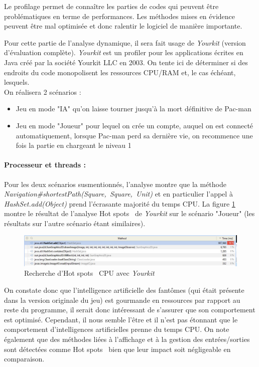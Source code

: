 \documentclass[12pt, openany]{report}
\begin{document}
Le profilage permet de connaître les parties de codes qui peuvent être problématiques en terme de performances. Les méthodes mises en évidence peuvent être mal optimisée et donc ralentir le logiciel de manière importante.


Pour cette partie de l'analyse dynamique, il sera fait usage de \textit{Yourkit} (version d'évaluation complète). \textit{Yourkit} est un profiler pour les applications écrites en Java créé par la société Yourkit LLC en 2003.  On tente ici de déterminer si des endroits du code monopolisent les ressources CPU/RAM et, le cas échéant, lesquels.\\


On réalisera 2 scénarios :
\begin{itemize}
	\item Jeu en mode "IA" qu'on laisse tourner jusqu'à la mort définitive de Pac-man
	\item Jeu en mode "Joueur" pour lequel on crée un compte, auquel on est connecté automatiquement, lorsque Pac-man perd sa dernière vie, on recommence une fois la partie en chargeant le niveau 1
\end{itemize}
\paragraph{Processeur et threads : }
Pour les deux scénarios susmentionnés, l'analyse montre que la méthode \mbox{\textit{Navigation\#shortestPath(Square, Square, Unit)}} et en particulier l'appel à \mbox{\textit{HashSet.add(Object)}} prend l'écrasante majorité du temps CPU. La figure \ref{hotspot} montre le résultat de l'analyse \og Hot spots \fg \, de \textit{Yourkit} sur le scénario "Joueur" (les résultats sur l'autre scénario étant similaires).
\begin{figure}[h]
	\centering
	\includegraphics[width=16cm]{Images/hotspot.JPG}
	\caption{\label{hotspot} Recherche d'\og Hot spots \fg \, CPU avec \textit{Yourkit}}
\end{figure}

On constate donc que l'intelligence artificielle des fantômes (qui était présente dans la version originale du jeu) est gourmande en ressources par rapport au reste du programme, il serait donc intéressant de s'assurer que son comportement est optimisé. Cependant, il nous semble l'être et il n'est pas étonnant que le comportement d'intelligences artificielles prenne du temps CPU. On note également que des méthodes liées à l'affichage et à la gestion des entrées/sorties sont détectées comme \og Hot spots \fg \, bien que leur impact soit négligeable en comparaison.
\end{document}
